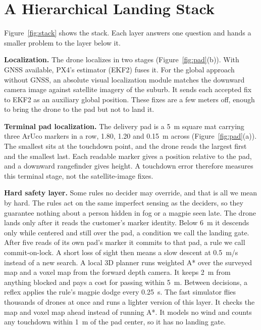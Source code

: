 \section{A Hierarchical Landing Stack}



Figure~\ref{fig:stack} shows the stack. Each layer answers one question and hands a smaller problem to the layer below it.

\textbf{Localization.} The drone localizes in two stages (Figure~\ref{fig:pad}(b)). With GNSS available, PX4's estimator (EKF2) fuses it. For the global approach without GNSS, an absolute visual localization module matches the downward camera image against satellite imagery of the suburb. It sends each accepted fix to EKF2 as an auxiliary global position. These fixes are a few meters off, enough to bring the drone to the pad but not to land it.

\textbf{Terminal pad localization.} The delivery pad is a 5~m square mat carrying three ArUco markers \cite{garrido2014} in a row, 1.80, 1.20 and 0.15~m across (Figure~\ref{fig:pad}(a)). The smallest sits at the touchdown point, and the drone reads the largest first and the smallest last. Each readable marker gives a position relative to the pad, and a downward rangefinder gives height. A touchdown error therefore measures this terminal stage, not the satellite-image fixes.



\textbf{Hard safety layer.} Some rules no decider may override, and that is all we mean by hard. The rules act on the same imperfect sensing as the deciders, so they guarantee nothing about a person hidden in fog or a magpie seen late. The drone lands only after it reads the customer's marker identity. Below 6~m it descends only while centered and still over the pad, a condition we call the landing gate. After five reads of its own pad's marker it commits to that pad, a rule we call commit-on-lock. A short loss of sight then means a slow descent at 0.5~m/s instead of a new search. A local 3D planner runs weighted A* over the surveyed map and a voxel map from the forward depth camera. It keeps 2~m from anything blocked and pays a cost for passing within 5~m. Between decisions, a reflex applies the rule's magpie dodge every 0.25~s. The fast simulator flies thousands of drones at once and runs a lighter version of this layer. It checks the map and voxel map ahead instead of running A*. It models no wind and counts any touchdown within 1~m of the pad center, so it has no landing gate.

